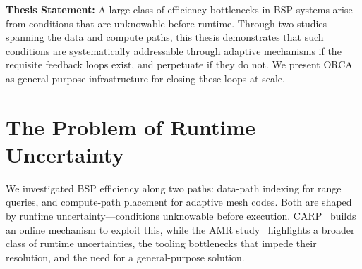\begin{tcolorbox}[thesisbox]
  \textbf{Thesis Statement:} A large class of efficiency bottlenecks in BSP systems arise from
  conditions that are unknowable before runtime.
  Through two studies spanning the data and compute paths, this thesis demonstrates that such
  conditions are systematically addressable through adaptive mechanisms if the requisite feedback
  loops exist, and perpetuate if they do not.
  We present ORCA as general-purpose infrastructure for closing these loops at scale.
\end{tcolorbox}



\section{The Problem of Runtime Uncertainty}
\label{sec:intro:problem}

We investigated BSP efficiency along two paths: data-path indexing for range queries, and
compute-path placement for adaptive mesh codes.
Both are shaped by runtime uncertainty---conditions unknowable before execution.
CARP~\cite{Jain2024:CARP} builds an online mechanism to exploit this, while the AMR
study~\cite{Jain2025:AMR} highlights a broader class of
runtime uncertainties, the tooling bottlenecks that impede their resolution, and the need for a
general-purpose solution.

